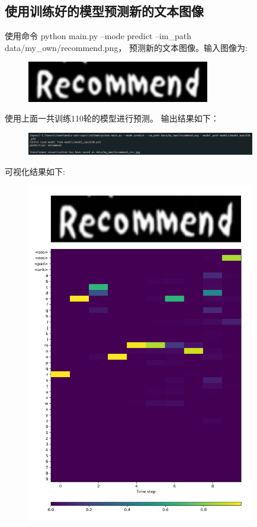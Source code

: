 \documentclass[a4paper]{article}
\begin{document}
\subsection{使用训练好的模型预测新的文本图像}
\hspace{2em}使用命令 python main.py --mode predict --im\_path data/my\_own/recommend.png，
预测新的文本图像。输入图像为:\\
\begin{figure}[h]
    \centering
    \includegraphics[width=8cm]{recommend.png}
\end{figure}
\hspace{2em}使用上面一共训练110轮的模型进行预测。
输出结果如下：\\
\begin{figure}[h]
    \centering
    \includegraphics[width=10cm]{3.png}
\end{figure}
可视化结果如下:\par
\begin{figure}[H]
    \centering
    \includegraphics[width=10cm]{recommend_vis.jpg}
\end{figure}
\end{document}
